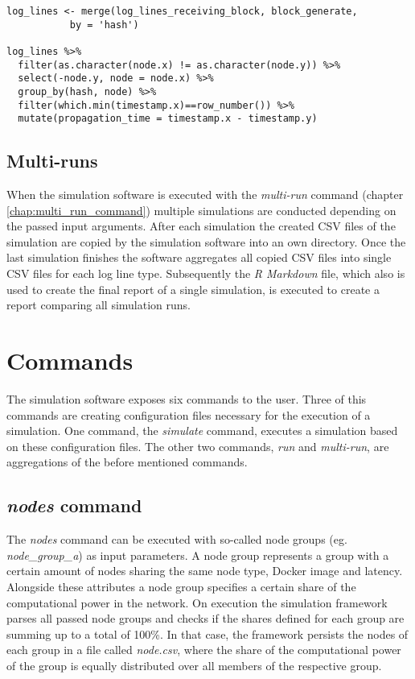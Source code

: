 \begin{minipage}{\linewidth}
\begin{lstlisting}[caption=Calculation of propagation time with \textit{R}, label={lst:propagation_time}, basicstyle=\ttfamily, captionpos=b]
log_lines <- merge(log_lines_receiving_block, block_generate,
		   by = 'hash')

log_lines %>%
  filter(as.character(node.x) != as.character(node.y)) %>%
  select(-node.y, node = node.x) %>%
  group_by(hash, node) %>%
  filter(which.min(timestamp.x)==row_number()) %>%
  mutate(propagation_time = timestamp.x - timestamp.y)
\end{lstlisting}
\end{minipage}
 
\subsection{Multi-runs}

When the simulation software is executed with the \textit{multi-run} command (chapter \ref{chap:multi_run_command}) multiple simulations are conducted depending on the passed input arguments.
After each simulation the created CSV files of the simulation are copied by the simulation software into an own directory.
Once the last simulation finishes the software aggregates all copied CSV files into single CSV files for each log line type.
Subsequently the \textit{R Markdown} file, which also is used to create the final report of a single  simulation, is executed to create a report comparing all simulation runs.
 
\section{Commands}
\label{chap:commands}

The simulation software exposes six commands to the user.
Three of this commands are creating configuration files necessary for the execution of a simulation. One command, the \textit{simulate} command, executes a simulation based on these configuration files.
The other two commands, \textit{run} and \textit{multi-run}, are aggregations of the before mentioned commands.

\subsection{\textit{nodes} command} \label{chap:nodes_command}

The \textit{nodes} command can be executed with so-called node groups (eg. \textit{node\_group\_a}) as input parameters.
A node group represents a group with a certain amount of nodes sharing the same node type, Docker image and latency.
Alongside these attributes a node group specifies a certain share of the computational power in the network.
On execution the simulation framework parses all passed node groups and checks if the shares defined for each group are summing up to a total of 100\%.
In that case, the framework persists the nodes of each group in a file called \textit{node.csv}, where the share of the computational power of the group is equally distributed over all members of the respective group.

